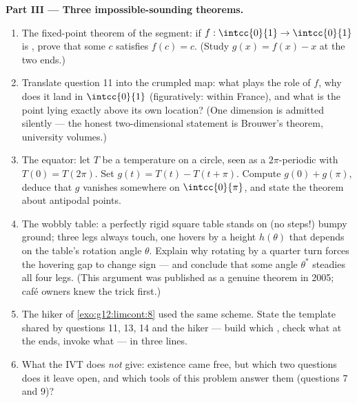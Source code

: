 \begin{problem}
\medskip
\noindent\textbf{Part III --- Three impossible-sounding
theorems.}
\begin{enumerate}[resume]
  \item The fixed-point theorem of the segment: if
        $f : \intcc{0}{1} \to \intcc{0}{1}$ is , prove
        that some $c$ satisfies $f(c) = c$. (Study
        $g(x) = f(x) - x$ at the two ends.)
  \item Translate question 11 into the crumpled map: what plays
        the role of $f$, why does it land in
        $\intcc{0}{1}$ (figuratively: within France), and what
        is the point lying exactly above its own location? (One
        dimension is admitted silently --- the honest
        two-dimensional statement is Brouwer's theorem,
        university volumes.)
  \item The equator: let $T$ be a  temperature on a
        circle, seen as a $2\pi$-periodic  with
        $T(0) = T(2\pi)$. Set $g(t) = T(t) - T(t + \pi)$.
        Compute $g(0) + g(\pi)$, deduce that $g$ vanishes
        somewhere on $\intcc{0}{\pi}$, and state the theorem
        about antipodal points.
  \item The wobbly table: a perfectly rigid square table stands
        on  (no steps!) bumpy ground; three legs
        always touch, one hovers by a height $h(\theta)$ that
        depends  on the table's rotation angle
        $\theta$. Explain why rotating by a quarter turn forces
        the hovering gap to change sign --- and conclude that
        some angle $\theta^*$ steadies all four legs. (This
        argument was published as a genuine theorem in 2005;
        caf\'e owners knew the trick first.)
  \item The hiker of \cref{exo:g12:limcont:8} used the same
        scheme. State the template shared by questions 11, 13,
        14 and the hiker --- build which , check what
        at the ends, invoke what --- in three lines.
  \item What the IVT does \emph{not} give: existence came free,
        but which two questions does it leave open, and which
        tools of this problem answer them (questions 7 and 9)?
\end{enumerate}


\end{problem}
